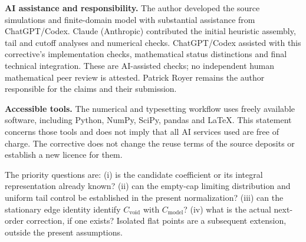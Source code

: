 \documentclass[11pt,a4paper]{article}
\newcommand{\Cmodel}{C_{\mathrm{model}}}
\newcommand{\Cvoid}{C_{\mathrm{void}}}
\begin{document}
\textbf{AI assistance and responsibility.} The author developed the source simulations and finite-domain model with substantial assistance from ChatGPT/Codex. Claude (Anthropic) contributed the initial heuristic assembly, tail and cutoff analyses and numerical checks. ChatGPT/Codex assisted with this corrective's implementation checks, mathematical status distinctions and final technical integration. These are AI-assisted checks; no independent human mathematical peer review is attested. Patrick Royer remains the author responsible for the claims and their submission.

\textbf{Accessible tools.} The numerical and typesetting workflow uses freely available software, including Python, NumPy, SciPy, pandas and \LaTeX{}. This statement concerns those tools and does not imply that all AI services used are free of charge. The corrective does not change the reuse terms of the source deposits or establish a new licence for them.

The priority questions are: (i) is the candidate coefficient or its integral representation already known? (ii) can the empty-cap limiting distribution and uniform tail control be established in the present normalization? (iii) can the stationary edge identity identify $\Cvoid$ with $\Cmodel$? (iv) what is the actual next-order correction, if one exists? Isolated flat points are a subsequent extension, outside the present assumptions.
\end{document}
